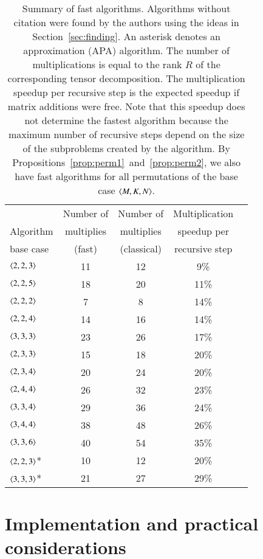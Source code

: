 \documentclass[preprint]{sigplanconf}
\begin{document}
\begin{table}[tb]
\centering
\caption{
Summary of fast algorithms.
Algorithms without citation were found by the authors using the ideas in Section~\ref{sec:finding}.
An asterisk denotes an approximation (APA) algorithm.
The number of multiplications  is equal to the rank $R$ of the corresponding tensor decomposition.
The multiplication speedup per recursive step is the expected speedup if
matrix additions were free.
Note that this speedup does not determine the fastest algorithm because the maximum number
of recursive steps depend on the size of the subproblems created by the algorithm.
By Propositions~\ref{prop:perm1}~and~\ref{prop:perm2}, we also have fast algorithms for all permutations of the base case $\left\langle M, K, N\right\rangle$.
}
\begin{tabular}{l c c c c}
\toprule
                & Number of  & Number of    & Multiplication \\
Algorithm              & multiplies    &  multiplies     &  speedup per \\
base case &   (fast)         & (classical)     & recursive step \\\midrule
$\left\langle2, 2, 3\right\rangle$ & 11 & 12 & 9\% \\
$\left\langle2, 2, 5\right\rangle$ & 18 & 20 & 11\% \\
$\left\langle2, 2, 2\right\rangle$ \cite{strassen1969gaussian} & 7 & 8 & 14\% \\
$\left\langle2, 2, 4\right\rangle$ & 14 & 16 & 14\% \\
$\left\langle3, 3, 3\right\rangle$ & 23 & 26 & 17\% \\
$\left\langle2, 3, 3\right\rangle$ & 15 & 18 & 20\% \\
$\left\langle2, 3, 4\right\rangle$ & 20 & 24 & 20\% \\
$\left\langle2, 4, 4\right\rangle$ & 26 & 32 & 23\% \\
$\left\langle3, 3, 4\right\rangle$ & 29 & 36 & 24\% \\
$\left\langle3, 4, 4\right\rangle$ & 38 & 48 & 26\% \\
$\left\langle3, 3, 6\right\rangle$ \cite{smirnov2013bilinear} & 40 & 54 & 35\% \\
\midrule
$\left\langle2, 2, 3\right\rangle$* \cite{BCRL79} & 10 & 12 & 20\% \\
$\left\langle3, 3, 3\right\rangle$* \cite{Schonhage81} & 21 & 27 & 29\% \\
\bottomrule
\end{tabular}
\label{tab:algorithms}
\end{table}

\section{Implementation and practical considerations}
\end{document}
